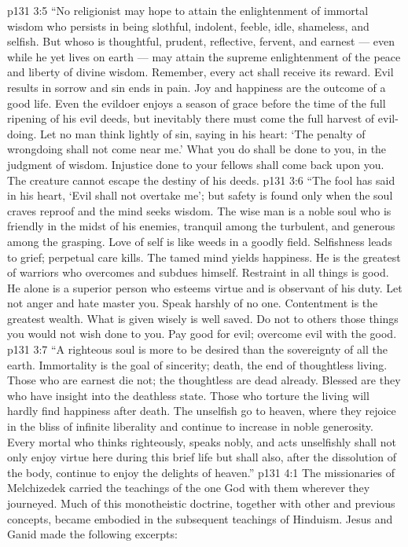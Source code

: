 \vs p131 3:5 “No religionist may hope to attain the enlightenment of immortal wisdom who persists in being slothful, indolent, feeble, idle, shameless, and selfish. But whoso is thoughtful, prudent, reflective, fervent, and earnest --- even while he yet lives on earth --- may attain the supreme enlightenment of the peace and liberty of divine wisdom. Remember, every act shall receive its reward. Evil results in sorrow and sin ends in pain. Joy and happiness are the outcome of a good life. Even the evildoer enjoys a season of grace before the time of the full ripening of his evil deeds, but inevitably there must come the full harvest of evil\hyp{}doing. Let no man think lightly of sin, saying in his heart: ‘The penalty of wrongdoing shall not come near me.’ What you do shall be done to you, in the judgment of wisdom. Injustice done to your fellows shall come back upon you. The creature cannot escape the destiny of his deeds.
\vs p131 3:6 “The fool has said in his heart, ‘Evil shall not overtake me’; but safety is found only when the soul craves reproof and the mind seeks wisdom. The wise man is a noble soul who is friendly in the midst of his enemies, tranquil among the turbulent, and generous among the grasping. Love of self is like weeds in a goodly field. Selfishness leads to grief; perpetual care kills. The tamed mind yields happiness. He is the greatest of warriors who overcomes and subdues himself. Restraint in all things is good. He alone is a superior person who esteems virtue and is observant of his duty. Let not anger and hate master you. Speak harshly of no one. Contentment is the greatest wealth. What is given wisely is well saved. Do not to others those things you would not wish done to you. Pay good for evil; overcome evil with the good.
\vs p131 3:7 “A righteous soul is more to be desired than the sovereignty of all the earth. Immortality is the goal of sincerity; death, the end of thoughtless living. Those who are earnest die not; the thoughtless are dead already. Blessed are they who have insight into the deathless state. Those who torture the living will hardly find happiness after death. The unselfish go to heaven, where they rejoice in the bliss of infinite liberality and continue to increase in noble generosity. Every mortal who thinks righteously, speaks nobly, and acts unselfishly shall not only enjoy virtue here during this brief life but shall also, after the dissolution of the body, continue to enjoy the delights of heaven.”
\vs p131 4:1 The missionaries of Melchizedek carried the teachings of the one God with them wherever they journeyed. Much of this monotheistic doctrine, together with other and previous concepts, became embodied in the subsequent teachings of Hinduism. Jesus and Ganid made the following excerpts:
